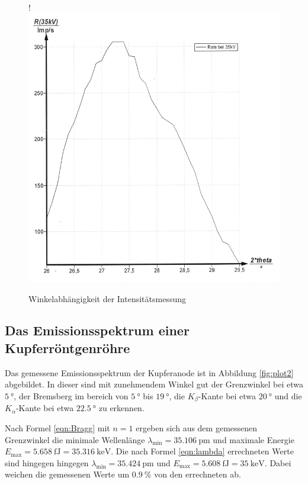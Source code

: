 \begin{figure}[H]!
  \centering
  \includegraphics[scale=0.3]{content/bild1.png}
  \caption{Winkelabhängigkeit der Intensitätsmessung}
  \label{fig:plot1}
\end{figure}

\subsection{Das Emissionsspektrum einer Kupferröntgenröhre}

Das gemessene Emissionsspektrum der Kupferanode ist in Abbildung \ref{fig:plot2} abgebildet.
In dieser sind mit zunehmendem Winkel gut der Grenzwinkel bei etwa $\SI{5}{\degree}$,
der Bremsberg im bereich von $\SI{5}{\degree}$ bis $\SI{19}{\degree}$, die 
$K_\beta$-Kante bei etwa $\SI{20}{\degree}$ und die $K_\alpha$-Kante bei 
etwa $\SI{22.5}{\degree}$ zu erkennen. 

Nach Formel \eqref{eqn:Bragg} mit $n = 1$ ergeben sich aus dem gemessenen Grenzwinkel die 
minimale Wellenlänge $\lambda_\text{min} = \SI{35.106}{\pico\meter}$ und maximale
Energie $E_\text{max} = \SI{5.658}{\femto\joule} = \SI{35.316}{\kilo\eV}$.
Die nach Formel \eqref{eqn:lambda} errechneten Werte sind hingegen hingegen
$\lambda_\text{min} = \SI{35.424}{\pico\meter}$ und 
$E_\text{max} = \SI{5.608}{\femto\joule} = \SI{35}{\kilo\eV}$.
Dabei weichen die gemessenen Werte um $\SI{0.9}{\percent}$ von den errechneten ab.

